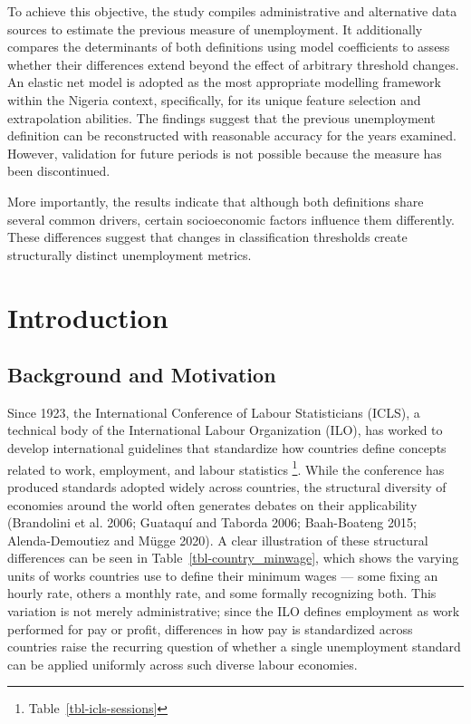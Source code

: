 \documentclass[
  letterpaper,
  DIV=11,
  numbers=noendperiod]{scrartcl}
\begin{document}
To achieve this objective, the study compiles administrative and
alternative data sources to estimate the previous measure of
unemployment. It additionally compares the determinants of both
definitions using model coefficients to assess whether their differences
extend beyond the effect of arbitrary threshold changes. An elastic net
model is adopted as the most appropriate modelling framework within the
Nigeria context, specifically, for its unique feature selection and
extrapolation abilities. The findings suggest that the previous
unemployment definition can be reconstructed with reasonable accuracy
for the years examined. However, validation for future periods is not
possible because the measure has been discontinued.

More importantly, the results indicate that although both definitions
share several common drivers, certain socioeconomic factors influence
them differently. These differences suggest that changes in
classification thresholds create structurally distinct unemployment
metrics.

\clearpage

\newpage

\tableofcontents

\listoffigures

\listoftables

\newpage

\section{Introduction}\label{introduction}

\subsection{Background and Motivation}\label{background-and-motivation}

Since 1923, the International Conference of Labour Statisticians (ICLS),
a technical body of the International Labour Organization (ILO), has
worked to develop international guidelines that standardize how
countries define concepts related to work, employment, and labour
statistics \footnote{Table~\ref{tbl-icls-sessions}}. While the
conference has produced standards adopted widely across countries, the
structural diversity of economies around the world often generates
debates on their applicability (Brandolini et al. 2006; Guataquí and
Taborda 2006; Baah-Boateng 2015; Alenda-Demoutiez and Mügge 2020). A
clear illustration of these structural differences can be seen in
Table~\ref{tbl-country_minwage}, which shows the varying units of works
countries use to define their minimum wages --- some fixing an hourly
rate, others a monthly rate, and some formally recognizing both. This
variation is not merely administrative; since the ILO defines employment
as work performed for pay or profit, differences in how pay is
standardized across countries raise the recurring question of whether a
single unemployment standard can be applied uniformly across such
diverse labour economies.
\end{document}
